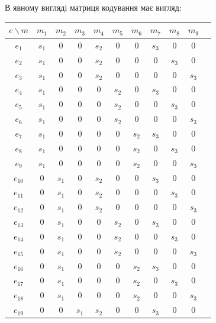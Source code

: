 \begin{example}
    В явному вигляді матриця кодування має вигляд:
    \begin{center}
        \begin{tabular}{|c|c|c|c|c|c|c|c|c|c|c|}
            \hline
            $e \backslash m$ & $m_1$ & $m_2$ & $m_3$ & $m_4$ & $m_5$ & $m_6$ & $m_7$ & $m_8$ & $m_9$ \\\hline
            $e_{1}$ & $s_1$ & 0 & 0 & $s_2$ & 0 & 0 & $s_3$ & 0 & 0 \\\hline
            $e_{2}$ & $s_1$ & 0 & 0 & $s_2$ & 0 & 0 & 0 & $s_3$ & 0 \\\hline
            $e_{3}$ & $s_1$ & 0 & 0 & $s_2$ & 0 & 0 & 0 & 0 & $s_3$ \\\hline
            $e_{4}$ & $s_1$ & 0 & 0 & 0 & $s_2$ & 0 & $s_3$ & 0 & 0 \\\hline
            $e_{5}$ & $s_1$ & 0 & 0 & 0 & $s_2$ & 0 & 0 & $s_3$ & 0 \\\hline
            $e_{6}$ & $s_1$ & 0 & 0 & 0 & $s_2$ & 0 & 0 & 0 & $s_3$ \\\hline
            $e_{7}$ & $s_1$ & 0 & 0 & 0 & 0 & $s_2$ & $s_3$ & 0 & 0 \\\hline
            $e_{8}$ & $s_1$ & 0 & 0 & 0 & 0 & $s_2$ & 0 & $s_3$ & 0 \\\hline
            $e_{9}$ & $s_1$ & 0 & 0 & 0 & 0 & $s_2$ & 0 & 0 & $s_3$ \\\hline
            $e_{10}$ & 0 & $s_1$ & 0 & $s_2$ & 0 & 0 & $s_3$ & 0 & 0 \\\hline
            $e_{11}$ & 0 & $s_1$ & 0 & $s_2$ & 0 & 0 & 0 & $s_3$ & 0 \\\hline
            $e_{12}$ & 0 & $s_1$ & 0 & $s_2$ & 0 & 0 & 0 & 0 & $s_3$ \\\hline
            $e_{13}$ & 0 & $s_1$ & 0 & 0 & $s_2$ & 0 & $s_3$ & 0 & 0 \\\hline
            $e_{14}$ & 0 & $s_1$ & 0 & 0 & $s_2$ & 0 & 0 & $s_3$ & 0 \\\hline
            $e_{15}$ & 0 & $s_1$ & 0 & 0 & $s_2$ & 0 & 0 & 0 & $s_3$ \\\hline
            $e_{16}$ & 0 & $s_1$ & 0 & 0 & 0 & $s_2$ & $s_3$ & 0 & 0 \\\hline
            $e_{17}$ & 0 & $s_1$ & 0 & 0 & 0 & $s_2$ & 0 & $s_3$ & 0 \\\hline
            $e_{18}$ & 0 & $s_1$ & 0 & 0 & 0 & $s_2$ & 0 & 0 & $s_3$ \\\hline
            $e_{19}$ & 0 & 0 & $s_1$ & $s_2$ & 0 & 0 & $s_3$ & 0 & 0 \\\hline

\end{tabular}
\end{center}
\end{example}
